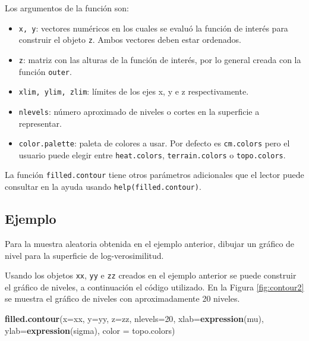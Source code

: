 \documentclass[10pt,]{krantz}
\makeatletter
\newenvironment{Shaded}{\begin{snugshade}}{\end{snugshade}}
\newcommand{\KeywordTok}[1]{\textcolor[rgb]{0.13,0.29,0.53}{\textbf{{#1}}}}
\newcommand{\DataTypeTok}[1]{\textcolor[rgb]{0.13,0.29,0.53}{{#1}}}
\newcommand{\DecValTok}[1]{\textcolor[rgb]{0.00,0.00,0.81}{{#1}}}
\newcommand{\NormalTok}[1]{{#1}}
\providecommand{\tightlist}{%
  \setlength{\itemsep}{0pt}\setlength{\parskip}{0pt}}
\newenvironment{kframe}{%
\medskip{}
\setlength{\fboxsep}{.8em}
 \def\at@end@of@kframe{}%
 \ifinner\ifhmode%
  \def\at@end@of@kframe{\end{minipage}}%
  \begin{minipage}{\columnwidth}%
 \fi\fi%
 \def\FrameCommand##1{\hskip\@totalleftmargin \hskip-\fboxsep
 \colorbox{shadecolor}{##1}\hskip-\fboxsep
     \hskip-\linewidth \hskip-\@totalleftmargin \hskip\columnwidth}%
 \MakeFramed {\advance\hsize-\width
   \@totalleftmargin\z@ \linewidth\hsize
   \@setminipage}}%
 {\par\unskip\endMakeFramed%
 \at@end@of@kframe}
\renewenvironment{Shaded}{\begin{kframe}}{\end{kframe}}
\makeatother
\begin{document}
Los argumentos de la función son:

\begin{itemize}
\tightlist
\item
  \texttt{x,\ y}: vectores numéricos en los cuales se evaluó la función
  de interés para construir el objeto \texttt{z}. Ambos vectores deben
  estar ordenados.
\item
  \texttt{z}: matriz con las alturas de la función de interés, por lo
  general creada con la función \texttt{outer}.
\item
  \texttt{xlim,\ ylim,\ zlim}: límites de los ejes x, y e z
  respectivamente.
\item
  \texttt{nlevels}: número aproximado de niveles o cortes en la
  superficie a representar.
\item
  \texttt{color.palette}: paleta de colores a usar. Por defecto es
  \texttt{cm.colors} pero el usuario puede elegir entre
  \texttt{heat.colors}, \texttt{terrain.colors} o \texttt{topo.colors}.
\end{itemize}

La función \texttt{filled.contour} tiene otros parámetros adicionales
que el lector puede consultar en la ayuda usando
\texttt{help(filled.contour)}.

\subsection*{Ejemplo}\label{ejemplo-18}


Para la muestra aleatoria obtenida en el ejemplo anterior, dibujar un
gráfico de nivel para la superficie de log-verosimilitud.

Usando los objetos \texttt{xx}, \texttt{yy} e \texttt{zz} creados en el
ejemplo anterior se puede construir el gráfico de niveles, a
continuación el código utilizado. En la Figura \ref{fig:contour2} se
muestra el gráfico de niveles con aproximadamente 20 niveles.

\begin{Shaded}
\begin{Highlighting}[]
\KeywordTok{filled.contour}\NormalTok{(}\DataTypeTok{x=}\NormalTok{xx, }\DataTypeTok{y=}\NormalTok{yy, }\DataTypeTok{z=}\NormalTok{zz, }\DataTypeTok{nlevels=}\DecValTok{20}\NormalTok{,}
               \DataTypeTok{xlab=}\KeywordTok{expression}\NormalTok{(mu), }\DataTypeTok{ylab=}\KeywordTok{expression}\NormalTok{(sigma),}
               \DataTypeTok{color =} \NormalTok{topo.colors)}
\end{Highlighting}
\end{Shaded}
\end{document}
